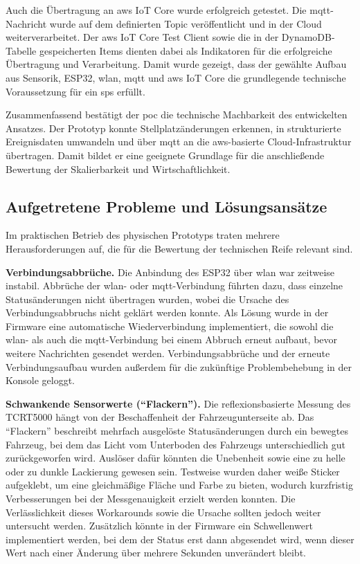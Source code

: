 Auch die Übertragung an \ac{aws} IoT Core wurde erfolgreich getestet. Die \ac{mqtt}-Nachricht wurde auf dem definierten Topic veröffentlicht und in der Cloud weiterverarbeitet. Der \ac{aws} IoT Core Test Client sowie die in der DynamoDB-Tabelle gespeicherten Items dienten dabei als Indikatoren für die erfolgreiche Übertragung und Verarbeitung. Damit wurde gezeigt, dass der gewählte Aufbau aus Sensorik, ESP32, \ac{wlan}, \ac{mqtt} und \ac{aws} IoT Core die grundlegende technische Voraussetzung für ein \ac{sps} erfüllt.

Zusammenfassend bestätigt der \ac{poc} die technische Machbarkeit des entwickelten Ansatzes. Der Prototyp konnte Stellplatzänderungen erkennen, in strukturierte Ereignisdaten umwandeln und über \ac{mqtt} an die \ac{aws}-basierte Cloud-Infrastruktur übertragen. Damit bildet er eine geeignete Grundlage für die anschließende Bewertung der Skalierbarkeit und Wirtschaftlichkeit.

\subsection{Aufgetretene Probleme und Lösungsansätze}\label{sec:problems}

Im praktischen Betrieb des physischen Prototyps traten mehrere Herausforderungen auf, die für die Bewertung der technischen Reife relevant sind.

\textbf{Verbindungsabbrüche.} Die Anbindung des ESP32 über \ac{wlan} war zeitweise instabil. Abbrüche der \ac{wlan}- oder \ac{mqtt}-Verbindung führten dazu, dass einzelne Statusänderungen nicht übertragen wurden, wobei die Ursache des Verbindungsabbruchs nicht geklärt werden konnte. Als Lösung wurde in der Firmware eine automatische Wiederverbindung implementiert, die sowohl die \ac{wlan}- als auch die \ac{mqtt}-Verbindung bei einem Abbruch erneut aufbaut, bevor weitere Nachrichten gesendet werden. Verbindungsabbrüche und der erneute Verbindungsaufbau wurden außerdem für die zukünftige Problembehebung in der Konsole geloggt.

\textbf{Schwankende Sensorwerte (\enquote{Flackern}).} Die reflexionsbasierte Messung des TCRT5000 hängt von der Beschaffenheit der Fahrzeugunterseite ab. Das \enquote{Flackern} beschreibt mehrfach ausgelöste Statusänderungen durch ein bewegtes Fahrzeug, bei dem das Licht vom Unterboden des Fahrzeugs unterschiedlich gut zurückgeworfen wird. Auslöser dafür könnten die Unebenheit sowie eine zu helle oder zu dunkle Lackierung gewesen sein. Testweise wurden daher weiße Sticker aufgeklebt, um eine gleichmäßige Fläche und Farbe zu bieten, wodurch kurzfristig Verbesserungen bei der Messgenauigkeit erzielt werden konnten. Die Verlässlichkeit dieses Workarounds sowie die Ursache sollten jedoch weiter untersucht werden. Zusätzlich könnte in der Firmware ein Schwellenwert implementiert werden, bei dem der Status erst dann abgesendet wird, wenn dieser Wert nach einer Änderung über mehrere Sekunden unverändert bleibt.

